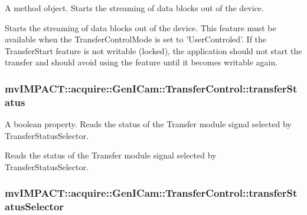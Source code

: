 A method object. Starts the streaming of data blocks out of the device. 

Starts the streaming of data blocks out of the device. This feature must be available when the Transfer\+Control\+Mode is set to 'User\+Controled'. If the Transfer\+Start feature is not writable (locked), the application should not start the transfer and should avoid using the feature until it becomes writable again. \hypertarget{classmv_i_m_p_a_c_t_1_1acquire_1_1_gen_i_cam_1_1_transfer_control_af49f438e572556b1b4cedd02ffa97a82}{
\subsubsection[{transfer\+Status}]{ mv\+I\+M\+P\+A\+C\+T\+::acquire\+::\+Gen\+I\+Cam\+::\+Transfer\+Control\+::transfer\+Status}}\label{classmv_i_m_p_a_c_t_1_1acquire_1_1_gen_i_cam_1_1_transfer_control_af49f438e572556b1b4cedd02ffa97a82}


A boolean property. Reads the status of the Transfer module signal selected by Transfer\+Status\+Selector. 

Reads the status of the Transfer module signal selected by Transfer\+Status\+Selector. \hypertarget{classmv_i_m_p_a_c_t_1_1acquire_1_1_gen_i_cam_1_1_transfer_control_ad0b5402cce56916cd955b9f441da2846}{
\subsubsection[{transfer\+Status\+Selector}]{ mv\+I\+M\+P\+A\+C\+T\+::acquire\+::\+Gen\+I\+Cam\+::\+Transfer\+Control\+::transfer\+Status\+Selector}}\label{classmv_i_m_p_a_c_t_1_1acquire_1_1_gen_i_cam_1_1_transfer_control_ad0b5402cce56916cd955b9f441da2846}


